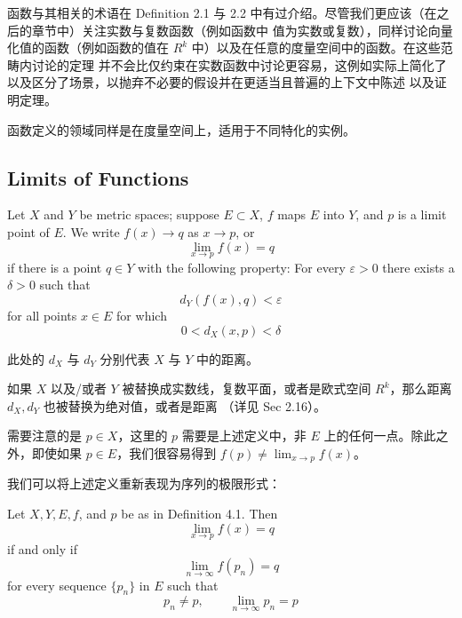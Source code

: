 \documentclass[../poma-notes.tex]{subfiles}
\begin{document}
函数与其相关的术语在 Definition 2.1 与 2.2 中有过介绍。尽管我们更应该（在之后的章节中）关注实数与复数函数（例如函数中
值为实数或复数），同样讨论向量化值的函数（例如函数的值在 $R^k$ 中）以及在任意的度量空间中的函数。在这些范畴内讨论的定理
并不会比仅约束在实数函数中讨论更容易，这例如实际上简化了以及区分了场景，以抛弃不必要的假设并在更适当且普遍的上下文中陈述
以及证明定理。

函数定义的领域同样是在度量空间上，适用于不同特化的实例。

\subsection*{Limits of Functions}

\begin{definition}
  Let $X$ and $Y$ be metric spaces; suppose $E \subset X$, $f$ maps $E$ into $Y$, and $p$ is a limit
  point of $E$. We write $f(x) \to q$ as $x \to p$, or
  \begin{equation}
    \lim_{x \to p} f(x) = q
  \end{equation}
  if there is a point $q \in Y$ with the following property: For every $\varepsilon > 0$ there exists a
  $\delta > 0$ such that
  \begin{equation}
    d_Y(f(x),q) < \varepsilon
  \end{equation}
  for all points $x \in E$ for which
  \begin{equation}
    0 < d_X(x,p) < \delta
  \end{equation}
\end{definition}

此处的 $d_X$ 与 $d_Y$ 分别代表 $X$ 与 $Y$ 中的距离。

如果 $X$ 以及/或者 $Y$ 被替换成实数线，复数平面，或者是欧式空间 $R^k$，那么距离 $d_X, d_Y$ 也被替换为绝对值，或者是距离
（详见 Sec 2.16）。

需要注意的是 $p \in X$，这里的 $p$ 需要是上述定义中，非 $E$ 上的任何一点。除此之外，即使如果 $p \in E$，我们很容易得到
$f(p) \ne \lim_{x \to p} f(x)$。

我们可以将上述定义重新表现为序列的极限形式：

\begin{theorem}
  Let $X, Y, E, f$, and $p$ be as in Definition 4.1. Then
  \begin{equation}
    \lim_{x \to p} f(x) = q
  \end{equation}
  if and only if
  \begin{equation}
    \lim_{n \to \infty} f(p_n) = q
  \end{equation}
  for every sequence $\{p_n\}$ in $E$ such that
  \begin{equation}
    p_n \ne p, \qquad \lim_{n \to \infty} p_n = p
  \end{equation}
\end{theorem}
\end{document}
